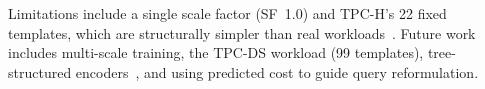 \documentclass[runningheads]{llncs}
\begin{document}
Limitations include a single scale factor (SF~1.0) and TPC-H's 22
fixed templates, which are structurally simpler than real
workloads~\cite{leis2015,zhao2022}.
Future work includes multi-scale training, the TPC-DS workload (99
templates), tree-structured encoders~\cite{marcus2019}, and using
predicted cost to guide query reformulation.



\end{document}

